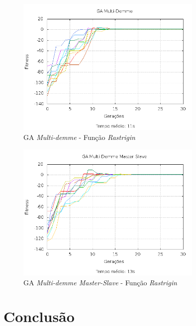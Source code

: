 \documentclass[12pt]{article}
\begin{document}
\begin{figure}[hp]
  \centering
  \includegraphics[width=0.8\textwidth]{md_f3.png}
  \caption{GA \emph{Multi-demme} - Função \emph{Rastrigin}}
\end{figure}

\begin{figure}[ht!p]
  \centering
  \includegraphics[width=0.8\textwidth]{mdms_f3.png}
  \caption{GA \emph{Multi-demme Master-Slave} - Função \emph{Rastrigin}}
\end{figure}





\newpage

\section{Conclusão} %
\label{sec:conclusao}
\end{document}
